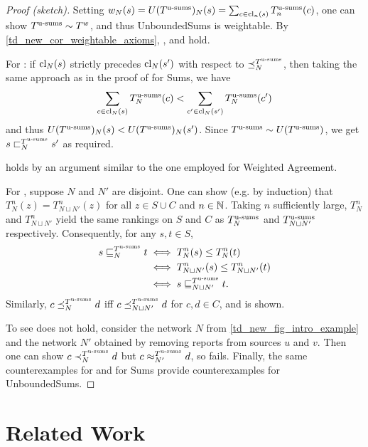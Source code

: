 \begin{proof}[Proof (sketch)]
    Setting $w_N(s) = U(T^{\operatorname{u-sums}})_N(s) = \sum_{c \in \operatorname{cl}_n(s)}{T^{\operatorname{u-sums}}_n(c)}$,
    one can show $T^{\operatorname{u-sums}} \sim T^{w}$, and thus UnboundedSums is
    weightable. By \cref{td_new_cor_weightable_axioms}, \claimcoherence{},
    \marginaltrustworthiness{} and \trustbasedmon{} hold.

    For \sourcecoherence{}: if $\operatorname{cl}_N(s)$ strictly precedes $\operatorname{cl}_N(s')$
    with respect to $\preceq_N^{T^{\operatorname{u-sums}}}$, then taking the same approach as in the
    proof of \sourcecoherence{} for Sums, we have
    \[
        \sum_{c \in \operatorname{cl}_N(s)}{T^{\operatorname{u-sums}}_N(c)}
        <
        \sum_{c' \in \operatorname{cl}_N(s')}{T^{\operatorname{u-sums}}_N(c')}
    \]
    and thus $U(T^{\operatorname{u-sums}})_N(s) < U(T^{\operatorname{u-sums}})_N(s')$. Since $T^{\operatorname{u-sums}} \sim
    U(T^{\operatorname{u-sums}})$, we get $s \sqsubset_N^{T^{\operatorname{u-sums}}} s'$ as required.

    \symmetry{} holds by an argument similar to the one employed for Weighted
    Agreement.

    For \disjointindependence{}, suppose $N$ and $N'$ are disjoint. One can
    show (e.g. by induction) that $T_N^n(z) = T_{N \sqcup N'}^n(z)$ for all $z
    \in S \cup C$ and $n \in \mathbb{N}$. Taking $n$ sufficiently
    large, $T_N^n$ and $T_{N \sqcup N'}^n$ yield the same rankings on $S$ and
    $C$ as $T^{\operatorname{u-sums}}_N$ and $T^{\operatorname{u-sums}}_{N \sqcup N'}$ respectively. Consequently,
    for any $s, t \in S$,
    \begin{align*}
        s \sqsubseteq_N^{T^{\operatorname{u-sums}}} t
        &\iff T_N^n(s) \le T_N^n(t) \\
        &\iff T_{N \sqcup N'}^n(s) \le T_{N \sqcup N'}^n(t) \\
        &\iff s \sqsubseteq_{N \sqcup N'}^{T^{\operatorname{u-sums}}} t.
    \end{align*}
    Similarly, $c \preceq_N^{T^{\operatorname{u-sums}}} d$ iff $c \preceq_{N \sqcup N'}^{T^{\operatorname{u-sums}}} d$ for
    $c, d \in C$, and \disjointindependence{} is shown.

    To see \classicalindependence{} does not hold, consider the network $N$
    from \cref{td_new_fig_intro_example} and the network $N'$ obtained by
    removing reports from sources $u$ and $v$. Then one can show $c
    \prec_N^{T^{\operatorname{u-sums}}} d$ but $c \approx_{N'}^{T^{\operatorname{u-sums}}} d$, so
    \classicalindependence{} fails. Finally, the same counterexamples for
    \conflictcoherence{} and \anticoherence{} for Sums provide counterexamples
    for UnboundedSums.
\end{proof}

\section{Related Work}
\label{td_new_sec_related_work}


